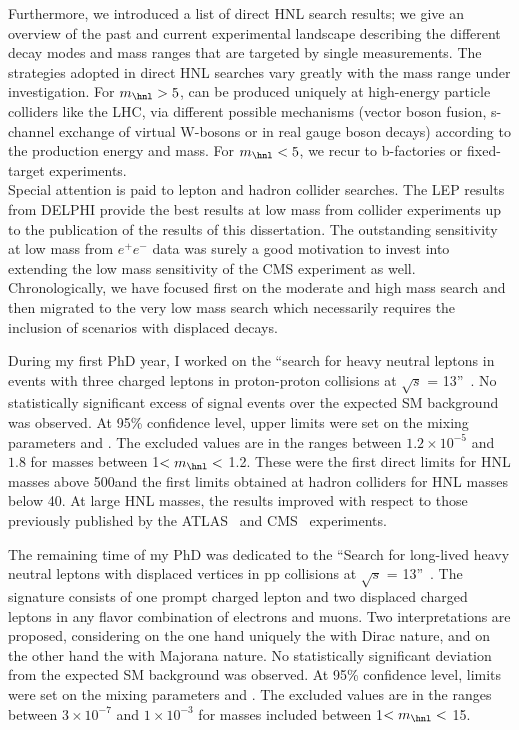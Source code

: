Furthermore, we introduced a list of direct HNL search results; we give an overview
of the past and current experimental landscape describing the different decay modes and
mass ranges that are targeted by single measurements.
The strategies adopted in direct HNL searches vary greatly with the mass range under investigation. For $m_{\hnl} > 5$\GeV, \hnl can be
produced uniquely at high-energy particle colliders like the LHC, via
different possible 
mechanisms (vector boson fusion, s-channel exchange of virtual
W-bosons or in real gauge boson decays) according to the production
energy and \hnl mass. For $m_{\hnl} < 5$\GeV, we recur to b-factories
or fixed-target experiments. \\
Special attention is paid to lepton and hadron collider
searches. The LEP results from DELPHI provide the best results at low mass from collider experiments up to the publication of the results
of this dissertation. The outstanding sensitivity at low mass from
$e^{+}e^{-}$ data was surely a good motivation to invest into extending the low mass sensitivity of
the CMS experiment as well.\\

Chronologically, we have focused first on the
moderate and high mass search and then migrated to the very low mass search which
necessarily requires the inclusion of scenarios with displaced decays.

During my first PhD year, I worked on the ``search for heavy neutral leptons in events with three charged
 leptons in proton-proton collisions at $\sqrt{s}$ =
 13\TeV''~\cite{Sirunyan:2018mtv}. No 
 statistically significant excess of signal events over the expected
SM background was observed. At 95\% confidence level, upper limits were set on the mixing
parameters \mixpare and \mixparm. The excluded values are in the
ranges between $1.2\times 10^{-5}$ and $1.8$ for masses 
between 1\GeV $< m_\hnl <$ 1.2\TeV. 
These were the first direct limits for HNL masses above 500\GeV and the first
limits obtained at hadron colliders for HNL masses below 40\GeV.
At large HNL masses, the results improved with respect to those previously published
by the ATLAS~\cite{Aad_2015} and CMS~\cite{Khachatryan_2015,Sirunyan:2018xiv}
experiments. 

The remaining time of my PhD was dedicated to the ``Search for long-lived heavy neutral leptons with displaced
vertices in pp collisions at $\sqrt{s}$ =
 13\TeV''~\cite{CMS-PAS-EXO-20-009}.
The signature consists of one prompt charged lepton and two displaced
charged leptons in any flavor combination of electrons
and muons. Two interpretations are proposed, considering
on the one hand uniquely the \hnl with 
Dirac nature, and on the other hand the \hnl with Majorana nature. 
No statistically significant deviation from the expected
SM background was observed. At 95\% confidence level, limits were set on the mixing
parameters \mixpare and \mixparm.
The excluded values are in the
ranges between $3\times 10^{-7}$ and $1\times 10^{-3}$ for masses included
between 1\GeV $< m_\hnl <$ 15\GeV. \\

